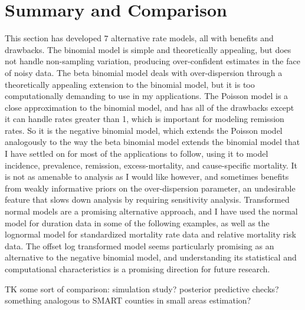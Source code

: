 \section{Summary and Comparison}
This section has developed $7$ alternative rate models, all with
benefits and drawbacks.  The binomial model is simple and
theoretically appealing, but does not handle non-sampling variation,
producing over-confident estimates in the face of noisy data.  The
beta binomial model deals with over-dispersion through a theoretically
appealing extension to the binomial model, but it is too
computationally demanding to use in my applications.  The Poisson
model is a close approximation to the binomial model, and has all of
the drawbacks except it can handle rates greater than 1, which is
important for modeling remission rates.  So it is the negative
binomial model, which extends the Poisson model analogously to the way
the beta binomial model extends the binomial model that I have settled
on for most of the applications to follow, using it to model
incidence, prevalence, remission, excess-mortality, and cause-specific
mortality. It is not as amenable to analysis as I would like however,
and sometimes benefits from weakly informative priors on the
over-dispersion parameter, an undesirable feature that slows down
analysis by requiring sensitivity analysis.  Transformed normal models
are a promising alternative approach, and I have used the normal model
for duration data in some of the following examples, as well as the
lognormal model for standardized mortality rate data and relative
mortality risk data. The offset log transformed model seems
particularly promising as an alternative to the negative binomial
model, and understanding its statistical and computational
characteristics is a promising direction for future research.

TK some sort of comparison: simulation study? posterior predictive
checks? something analogous to SMART counties in small areas
estimation?
